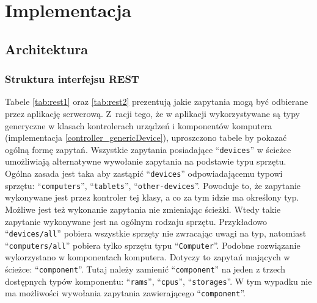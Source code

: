 \chapter{Implementacja}

\section{Architektura}


\subsection{Struktura interfejsu REST}
Tabele \ref{tab:rest1} oraz \ref{tab:rest2} prezentują jakie zapytania mogą być odbierane przez aplikację serwerową. Z~racji tego, że w aplikacji wykorzystywane są typy generyczne w klasach kontrolerach urządzeń i komponentów komputera (implementacja \ref{controller_genericDevice}), uproszczono tabele by pokazać ogólną formę zapytań. Wszystkie zapytania posiadające "`\texttt{devices}"' w ścieżce umożliwiają alternatywne wywołanie zapytania na podstawie typu sprzętu. Ogólna zasada jest taka aby zastąpić "`\texttt{devices}"' odpowiadającemu typowi sprzętu: "`\texttt{computers}"', "`\texttt{tablets}"', "`\texttt{other-devices}"'. Powoduje to, że zapytanie wykonywane jest przez kontroler tej klasy, a co za tym idzie ma określony typ. Możliwe jest też wykonanie zapytania nie zmieniając ścieżki. Wtedy takie zapytanie wykonywane jest na ogólnym rodzaju sprzętu. Przykładowo "`\texttt{devices/all}"' pobiera wszystkie sprzęty nie zwracając uwagi na typ, natomiast "`\texttt{computers/all}"' pobiera tylko sprzętu typu "`\texttt{Computer}"'. Podobne rozwiązanie wykorzystano w komponentach komputera. Dotyczy to zapytań mających w ścieżce: "`\texttt{component}"'. Tutaj należy zamienić "`\texttt{component}"' na jeden z trzech dostępnych typów komponentu: "`\texttt{rams}"', "`\texttt{cpus}"', "`\texttt{storages}"'. W tym wypadku nie ma możliwości wywołania zapytania zawierającego "`\texttt{component}"'.

